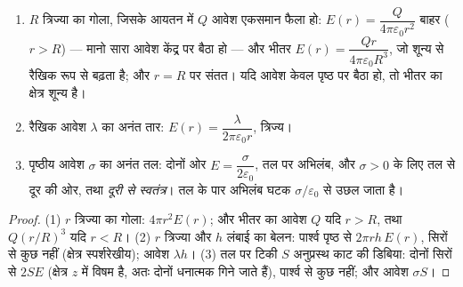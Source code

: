 \begin{proposition}[तीन चिरपरिचित क्षेत्र]\label{prop:b1:electrostatics-gauss:three}
\begin{enumerate}
  \item $R$ त्रिज्या का गोला, जिसके आयतन में $Q$ आवेश एकसमान फैला हो:
        $E(r) = \dfrac{Q}{4\pi\varepsilon_0r^2}$ बाहर ($r > R$) ---
        मानो सारा आवेश केंद्र पर बैठा हो --- और भीतर $E(r) =
        \dfrac{Qr}{4\pi\varepsilon_0R^3}$, जो शून्य से रैखिक रूप से बढ़ता है;
        और $r = R$ पर संतत। यदि आवेश केवल पृष्ठ पर बैठा हो, तो भीतर का
        क्षेत्र शून्य है।
  \item रैखिक आवेश $\lambda$ का अनंत तार: $E(r) =
        \dfrac{\lambda}{2\pi\varepsilon_0 r}$, त्रिज्य।
  \item पृष्ठीय आवेश $\sigma$ का अनंत तल: दोनों ओर $E = \dfrac{\sigma}{2\varepsilon_0}$,
        तल पर अभिलंब, और $\sigma > 0$ के लिए तल से दूर की ओर, तथा
        \emph{दूरी से स्वतंत्र}। तल के पार अभिलंब घटक
        $\sigma/\varepsilon_0$ से उछल जाता है।
\end{enumerate}
\end{proposition}

\begin{proof}
(1) $r$ त्रिज्या का गोला:  $4\pi r^2E(r)$; और भीतर का आवेश $Q$ यदि
$r > R$, तथा $Q(r/R)^3$ यदि $r < R$। (2) $r$ त्रिज्या और $h$ लंबाई का बेलन:
पार्श्व पृष्ठ से  $2\pi rh\,E(r)$, सिरों से कुछ नहीं
(क्षेत्र स्पर्शरेखीय); आवेश $\lambda h$। (3) तल पर टिकी $S$ अनुप्रस्थ काट
की डिबिया: दोनों सिरों से  $2SE$ (क्षेत्र $z$ में विषम है, अतः दोनों
धनात्मक गिने जाते हैं), पार्श्व से कुछ नहीं; और आवेश
$\sigma S$।
\end{proof}

